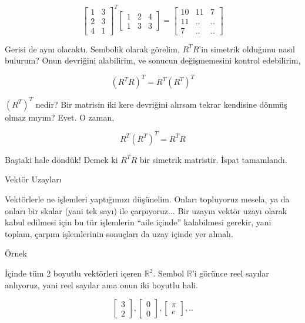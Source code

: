 \documentclass[12pt,fleqn]{article}\usepackage{../../common}
\begin{document}
$$ 
\left[\begin{array}{cc}
1 & 3 \\
2 & 3 \\
4 & 1 
\end{array}\right]^T
\left[\begin{array}{ccc}
1 & 2 & 4 \\
1 & 3 & 3 
\end{array}\right]
=
\left[\begin{array}{ccc}
10 & 11 & 7 \\
11 & .. & .. \\
7 & .. & ..
\end{array}\right]
$$  

Gerisi de aynı olacaktı. Sembolik olarak görelim, $R^TR$'in simetrik
olduğunu nasıl bulurum? Onun devriğini alabilirim, ve sonucun değişmemesini
kontrol edebilirim,

$$
(R^TR)^T = R^T(R^T)^T
$$

$(R^T)^T$ nedir? Bir matrisin iki kere devriğini alırsam tekrar kendisine dönmüş
olmaz mıyım? Evet. O zaman,

$$
R^T(R^T)^T = R^T R
$$

Baştaki hale döndük! Demek ki $R^TR$ bir simetrik matristir. İspat
tamamlandı. 

Vektör Uzayları

Vektörlerle ne işlemleri yaptığımızı düşünelim. Onları topluyoruz mesela,
ya da onları bir skalar (yani tek sayı) ile çarpıyoruz... Bir uzayın vektör
uzayı olarak kabul edilmesi için bu tür işlemlerin ``aile içinde''
kalabilmesi gerekir, yani toplam, çarpım işlemlerinin sonuçları da uzay
içinde yer almalı. 

Örnek

İçinde tüm 2 boyutlu vektörleri içeren $\mathbb{R}^2$. Sembol $\mathbb{R}$'i
görünce reel sayılar anlıyoruz, yani reel sayılar ama onun iki boyutlu hali.

$$ 
\left[\begin{array}{c}
3 \\ 2 
\end{array}\right], 
\left[\begin{array}{c}
0 \\ 0
\end{array}\right], 
\left[\begin{array}{c}
\pi \\ e
\end{array}\right], 
..
$$
\end{document}
